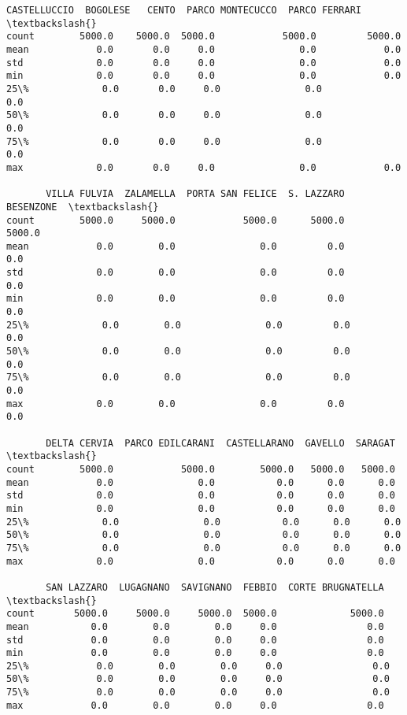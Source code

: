 \documentclass[11pt]{article}
\makeatletter
\newcommand{\boxspacing}{\kern\kvtcb@left@rule\kern\kvtcb@boxsep}
\newcommand{\prompt}[4]{
        {\ttfamily\llap{{\color{#2}[#3]:\hspace{3pt}#4}}\vspace{-\baselineskip}}
    }
\makeatother
\begin{document}
            \begin{tcolorbox}[breakable, size=fbox, boxrule=.5pt, pad at break*=1mm, opacityfill=0]
\prompt{Out}{outcolor}{25}{\boxspacing}
\begin{Verbatim}[commandchars=\\\{\}]
       CASTELLUCCIO  BOGOLESE   CENTO  PARCO MONTECUCCO  PARCO FERRARI  \textbackslash{}
count        5000.0    5000.0  5000.0            5000.0         5000.0
mean            0.0       0.0     0.0               0.0            0.0
std             0.0       0.0     0.0               0.0            0.0
min             0.0       0.0     0.0               0.0            0.0
25\%             0.0       0.0     0.0               0.0            0.0
50\%             0.0       0.0     0.0               0.0            0.0
75\%             0.0       0.0     0.0               0.0            0.0
max             0.0       0.0     0.0               0.0            0.0

       VILLA FULVIA  ZALAMELLA  PORTA SAN FELICE  S. LAZZARO  BESENZONE  \textbackslash{}
count        5000.0     5000.0            5000.0      5000.0     5000.0
mean            0.0        0.0               0.0         0.0        0.0
std             0.0        0.0               0.0         0.0        0.0
min             0.0        0.0               0.0         0.0        0.0
25\%             0.0        0.0               0.0         0.0        0.0
50\%             0.0        0.0               0.0         0.0        0.0
75\%             0.0        0.0               0.0         0.0        0.0
max             0.0        0.0               0.0         0.0        0.0

       DELTA CERVIA  PARCO EDILCARANI  CASTELLARANO  GAVELLO  SARAGAT  \textbackslash{}
count        5000.0            5000.0        5000.0   5000.0   5000.0
mean            0.0               0.0           0.0      0.0      0.0
std             0.0               0.0           0.0      0.0      0.0
min             0.0               0.0           0.0      0.0      0.0
25\%             0.0               0.0           0.0      0.0      0.0
50\%             0.0               0.0           0.0      0.0      0.0
75\%             0.0               0.0           0.0      0.0      0.0
max             0.0               0.0           0.0      0.0      0.0

       SAN LAZZARO  LUGAGNANO  SAVIGNANO  FEBBIO  CORTE BRUGNATELLA  \textbackslash{}
count       5000.0     5000.0     5000.0  5000.0             5000.0
mean           0.0        0.0        0.0     0.0                0.0
std            0.0        0.0        0.0     0.0                0.0
min            0.0        0.0        0.0     0.0                0.0
25\%            0.0        0.0        0.0     0.0                0.0
50\%            0.0        0.0        0.0     0.0                0.0
75\%            0.0        0.0        0.0     0.0                0.0
max            0.0        0.0        0.0     0.0                0.0


\end{Verbatim}
\end{tcolorbox}
\end{document}

